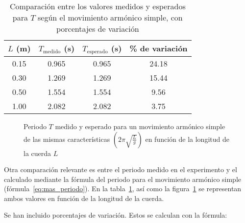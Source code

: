 \documentclass[letterpaper]{report}
\numberwithin{table}{section}
\begin{document}
\begin{table}[h]
  \centering
  \begin{tabular}{cccc}
    \toprule
    $L$ (m) & $T_{\text{medido}}$ (s) &
    $T_{\text{esperado}}$ (s) & \% de variación \\
    \midrule
    0.15 & 0.965 & 0.965 & 24.18 \\
    0.30 & 1.269 & 1.269 & 15.44 \\
    0.50 & 1.554 & 1.554 & 9.56 \\
    1.00 & 2.082 & 2.082 & 3.75 \\
    \bottomrule
  \end{tabular}

  \caption{Comparación entre los valores medidos y esperados para $T$
    según el movimiento armónico simple, con porcentajes de
  variación}\label{tab:comparación_longitud}
\end{table}

\begin{figure}[h]
  \centering
  \caption{Periodo $T$ medido y esperado para un movimiento armónico
    simple de las mismas características
    $\left(2\pi\sqrt{\frac{L}{g}}\right)$ en función de la longitud de
  la cuerda $L$}\label{fig:periodo_mas}
\end{figure}

Otra comparación relevante es entre el periodo medido en el
experimento y el calculado mediante la fórmula del periodo para el
movimiento armónico simple (fórmula~\eqref{eq:mas_periodo}). En la
tabla~\ref{tab:comparación_longitud}, así como la
figura~\ref{fig:periodo_mas} se representan ambos valores en
función de la longitud de la cuerda.

Se han incluido porcentajes de variación. Estos se calculan con la fórmula:
\end{document}

